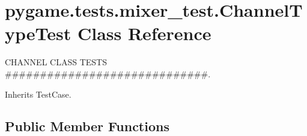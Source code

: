 \hypertarget{classpygame_1_1tests_1_1mixer__test_1_1_channel_type_test}{}\section{pygame.\+tests.\+mixer\+\_\+test.\+Channel\+Type\+Test Class Reference}
\label{classpygame_1_1tests_1_1mixer__test_1_1_channel_type_test}


C\+H\+A\+N\+N\+EL C\+L\+A\+SS T\+E\+S\+TS \#\#\#\#\#\#\#\#\#\#\#\#\#\#\#\#\#\#\#\#\#\#\#\#\#\#\#\#\#.  




Inherits Test\+Case.

\subsection*{Public Member Functions}
